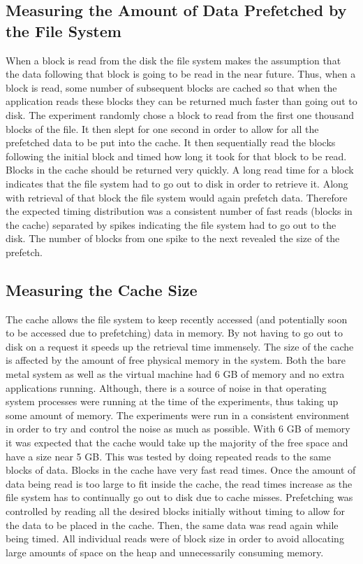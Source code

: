 \documentclass[letterpaper,twocolumn,10pt]{article}
\begin{document}
\subsection{Measuring the Amount of Data Prefetched by the File System}
When a block is read from the disk the file system makes the assumption that the data following that block is going to be read in the near future. 
Thus, when a block is read, some number of subsequent blocks are cached so that when the application reads these blocks they can be returned much faster than going out to disk. 
The experiment randomly chose a block to read from the first one thousand blocks of the file. 
It then slept for one second in order to allow for all the prefetched data to be put into the cache. 
It then sequentially read the blocks following the initial block and timed how long it took for that block to be read. 
Blocks in the cache should be returned very quickly. 
A long read time for a block indicates that the file system had to go out to disk in order to retrieve it. 
Along with retrieval of that block the file system would again prefetch data. 
Therefore the expected timing distribution was a consistent number of fast reads (blocks in the cache) separated by spikes indicating the file system had to go out to the disk. 
The number of blocks from one spike to the next revealed the size of the prefetch.

\subsection{Measuring the Cache Size}
The cache allows the file system to keep recently accessed (and potentially soon to be accessed due to prefetching) data in memory. 
By not having to go out to disk on a request it speeds up the retrieval time immensely. 
The size of the cache is affected by the amount of free physical memory in the system. 
Both the bare metal system as well as the virtual machine had 6 GB of memory and no extra applications running. 
Although, there is a source of noise in that operating system processes were running at the time of the experiments, thus taking up some amount of memory. 
The experiments were run in a consistent environment in order to try and control the noise as much as possible. 
With 6 GB of memory it was expected that the cache would take up the majority of the free space and have a size near 5 GB. 
This was tested by doing repeated reads to the same blocks of data. 
Blocks in the cache have very fast read times. 
Once the amount of data being read is too large to fit inside the cache, the read times increase as the file system has to continually go out to disk due to cache misses. 
Prefetching was controlled by reading all the desired blocks initially without timing to allow for the data to be placed in the cache. 
Then, the same data was read again while being timed. 
All individual reads were of block size in order to avoid allocating large amounts of space on the heap and unnecessarily consuming memory.
\end{document}
